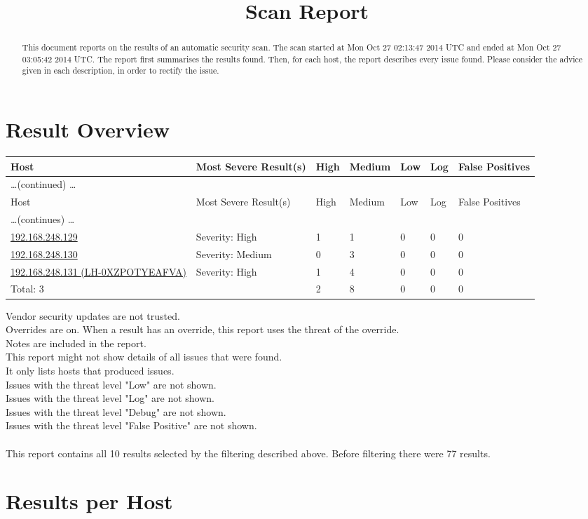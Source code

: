 \documentclass{article}
\title{Scan Report}
\begin{document}
\maketitle

\renewcommand{\abstractname}{Summary}
\begin{abstract}
This document reports on the results of an automatic security scan.
The scan started at Mon Oct 27 02:13:47 2014 UTC and ended at Mon Oct 27 03:05:42 2014 UTC.  The
report first summarises the results found.  Then, for each host,
the report describes every issue found.  Please consider the
advice given in each description, in order to rectify the issue.
\end{abstract}
\tableofcontents
\newpage
\section{Result Overview}

\begin{longtable}{|l|l|l|l|l|l|l|}
\hline
\rowcolor{openvas_report}Host&Most Severe Result(s)&High&Medium&Low&Log&False Positives\\
\hline
\endfirsthead
\multicolumn{6}{l}{\hfill\ldots (continued) \ldots}\\
\hline
\rowcolor{openvas_report}Host&Most Severe Result(s)&High&Medium&Low&Log&False Positives\\
\hline
\endhead
\hline
\multicolumn{6}{l}{\ldots (continues) \ldots}\\
\endfoot
\hline
\endlastfoot
\hline
\hyperref[host:192.168.248.129]{192.168.248.129}&Severity: High&1&1&0&0&0\\
\hline
\hyperref[host:192.168.248.130]{192.168.248.130}&Severity: Medium&0&3&0&0&0\\
\hline
\hyperref[host:192.168.248.131]{192.168.248.131 (LH-0XZPOTYEAFVA)}&Severity: High&1&4&0&0&0\\
\hline
\hline
Total: 3&&2&8&0&0&0\\
\hline
\end{longtable}
Vendor security updates are not trusted.\\
Overrides are on.  When a result has an override, this report uses the threat of the override.\\
Notes are included in the report.\\
This report might not show details of all issues that were found.\\
It only lists hosts that produced issues.\\
Issues with the threat level "Low" are not shown.\\
Issues with the threat level "Log" are not shown.\\
Issues with the threat level "Debug" are not shown.\\
Issues with the threat level "False Positive" are not shown.\\
\\
This report contains all 10 results selected by the filtering described above.  Before filtering there were 77 results.\section{Results per Host}
\end{document}
